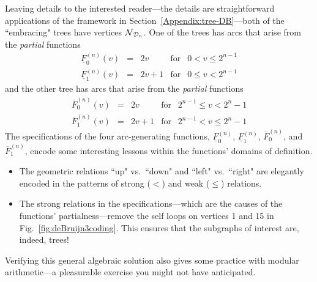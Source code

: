 \begin{itemize}
Leaving details to the interested reader---the details are straightforward applications of the framework in Section~\ref{Appendix:tree-DB}---both of the ``embracing" trees have vertices 
$\mbox{$\cal N$}_{{\cal D}_n}$.  One of the trees has arcs that arise from the {\em partial} functions
\[ \begin{array}{cccl}
\underline{F}^{(n)}_0(v) & = & 2v & \mbox{for } \ \ 0 < v \leq 2^{n-1} \\
\underline{F}^{(n)}_1(v) & = & 2v+1 & \mbox{for } \ \ 0 \leq v < 2^{n-1}
\end{array}
\]
and the other tree has arcs that arise from the {\em partial} functions
\[ \begin{array}{cccl}
\overline{F}^{(n)}_0(v) & = & 2v & \mbox{for } \ \ 2^{n-1} \leq v < 2^n -1 \\
\overline{F}^{(n)}_1(v) & = & 2v+1 & \mbox{for } \ \ 2^{n-1} < v \leq 2^n -1
\end{array}
\]
The specifications of the four arc-generating functions, $\underline{F}^{(n)}_0$, $\underline{F}^{(n)}_1$, $\overline{F}^{(n)}_0$, and $\overline{F}^{(n)}_1$, encode some interesting lessons within the functions' domains of definition.
\begin{itemize}
\item
The geometric relations ``up" vs.~``down" and ``left" vs.~``right" are elegantly encoded in the patterns of strong ($<$) and weak ($\leq$) relations.
\item
The strong relations in the specifications---which are the causes of the functions' partialness---remove the self loops on vertices 1 and 15 in Fig.~\ref{fig:deBruijn3coding}.  This ensures that the subgraphs of interest are, indeed, trees!
\end{itemize}

\smallskip

Verifying this general algebraic solution also gives some practice with modular arithmetic---a pleasurable exercise you might not have anticipated.

\medskip


\end{itemize}
